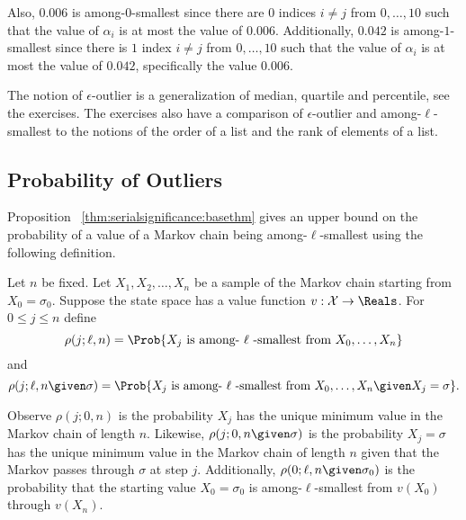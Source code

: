 \documentclass[12pt]{article}
\begin{document}
\begin{example}
    Also, \( 0.006 \) is among-\( 0 \)-smallest since there are \( 0 \)
    indices \( i \ne j \) from \( 0, \dots, 10 \) such that the value of
    \( \alpha_i \) is at most the value of \( 0.006 \).  Additionally, \(
    0.042 \) is among-\( 1 \)-smallest since there is \( 1 \) index \( i
    \ne j \) from \( 0, \dots, 10 \) such that the value of \( \alpha_i \)
    is at most the value of \( 0.042 \), specifically the value \( 0.006
    \).

    The notion of \( \epsilon \)-outlier is a generalization of median,
    quartile and percentile, see the exercises. The exercises also have
    a comparison of \( \epsilon \)-outlier and among-\( \ell \)-smallest
    to the notions of the order of a list and the rank of elements of a
    list.
\end{example}

\subsection*{Probability of Outliers}

Proposition~%
\ref{thm:serialsignificance:basethm} gives an upper bound on the
probability of a value of a Markov chain being
among-\(\ell\)-smallest using the following definition.
\begin{definition}
Let \( n \) be fixed.  Let \( X_1, X_2, \dots, X_n \) be a sample of the Markov
            chain starting from \( X_0 = \sigma_0 \).
            Suppose the state space has a value function \( v :
            \mathcal {X} \to \Reals \).
    For \( 0 \le j \le n \) define
    \[
	\rho(j; \ell, n) = \Prob{X_j \text{ is among- \(\ell\)
	-smallest from } X_0, \dots, X_n }
    \] and
    \[
	\rho(j; \ell, n \given \sigma) = \Prob{X_j \text{ is
	among- \(\ell\) -smallest from } X_0, \dots, X_n%
	\given X_j = \sigma }.
    \]
\end{definition}

Observe \( \rho(j; 0 ,n) \) is the probability \( X_j \)
has the unique minimum value in the Markov chain of length \(
n \).  Likewise, \( \rho(j; 0, n \given \sigma) \) is the
probability \( X_j = \sigma \) has the unique minimum value
in the Markov chain of length \( n \) given that the Markov
passes through \( \sigma \) at step \( j \).  Additionally,
\( \rho(0; \ell, n\given \sigma_0) \) is the probability that the
starting value \( X_0 = \sigma_0 \) is among-\(\ell\)-smallest from \(
v(X_0) \) through \(v(X_n) \).
\end{document}
